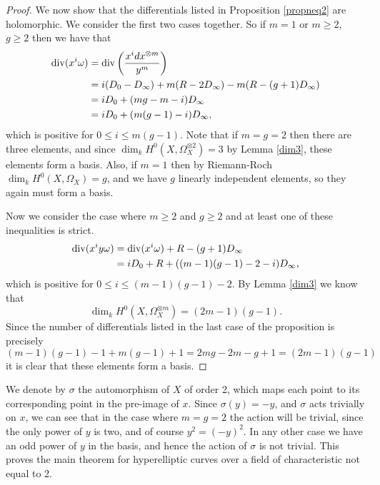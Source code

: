 \begin{proof}
    We now show that the differentials listed in Proposition \ref{propneq2} are holomorphic.
    We consider the first two cases together.
    So if $m=1$ or $m\geq 2$, $g\geq 2$ then we have that
        \begin{align*}
        \operatorname{div}(x^i\omega) & =  \operatorname{div} \left( \frac{x^idx^{\otimes m}}{y^m} \right)\\ 
        & =  i(D_0 -D_\infty) + m(R-2D_\infty) -m(R-(g+1)D_\infty) \\
        & =  iD_0 + (mg -m -i)D_\infty \\
        & =  iD_0 + (m(g-1) -i)D_\infty,
        \end{align*}
    which is positive for $0\leq i \leq m(g-1)$.
    Note that if $m=g=2$ then there are three elements, and since $\dim_kH^0(X,\Omega_X^{\otimes 2})=3$ by Lemma \ref{dim3}, these elements form a basis.
    Also, if $m=1$ then by Riemann-Roch $\dim_k H^0(X,\Omega_X)=g$, and we have $g$ linearly independent elements, so they again must form a basis.
    
    
    
    Now we consider the case where $m\geq 2$ and $g \geq 2$ and at least one of these inequalities is strict.
        \begin{align*}
        \operatorname{div} (x^iy\omega) & =  \operatorname{div}(x^i\omega) + R -(g+1)D_\infty \\
        & =  iD_0 + R +((m-1)(g-1)-2-i)D_\infty,
        \end{align*}
    which is positive for $0\leq i \leq (m-1)(g-1)-2$.
    By Lemma \ref{dim3} we know that 
        \[
        \dim_kH^0(X,\Omega_X^{\otimes m}) = (2m-1)(g-1).
        \]
    Since the number of differentials listed in the last case of the proposition is precisely
        \[
        (m-1)(g-1)-1 + m(g-1) +1 = 2mg -2m -g + 1 = (2m-1)(g-1)
        \]
    it is clear that these elements form a basis.
    \end{proof}

We denote by $\sigma$ the automorphism of $X$ of order 2, which maps each point to its corresponding point in the pre-image of $x$.
Since $\sigma(y) = -y$, and $\sigma$ acts trivially on $x$, we can see that in the case where $m=g=2$ the action will be trivial, since the only power of $y$ is two, and of course $y^2 = (-y)^2$.
In any other case we have an odd power of $y$ in the basis, and hence the action of $\sigma$ is not trivial.
This proves the main theorem for hyperelliptic curves over a field of characteristic not equal to 2.




